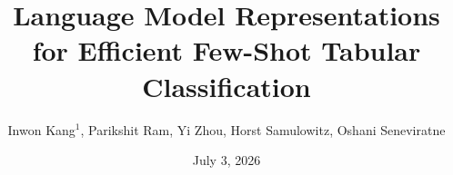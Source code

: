 \documentclass[
	10pt, %
	aspectratio=169, %
]{beamer}
\title[Language Model Representations for Efficient Few-Shot Tabular Classification]{Language Model Representations for Efficient Few-Shot Tabular Classification}
\author[]{Inwon Kang$^1$, Parikshit Ram, Yi Zhou, Horst Samulowitz, Oshani Seneviratne}
\institute[RPI, IBM]{Rensselaer Polytechcnic Institute$^1$, IBM Research$^2$}
\date[\today]{July 3, 2026}
\begin{document}
\begin{frame}[plain]
	\titlepage %
\end{frame}




\end{document}
